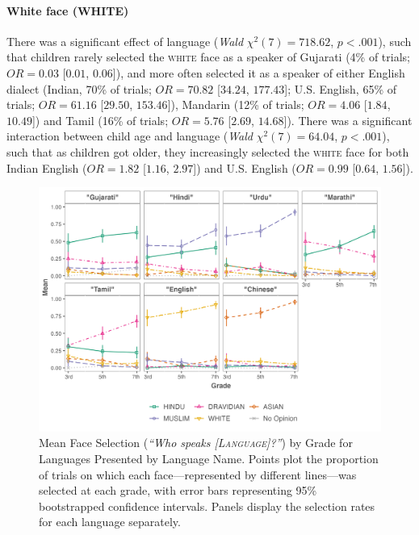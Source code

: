 \documentclass{foushee-adapted-preprint}
\begin{document}
\paragraph*{White face {\small{(WHITE)}}} 
There was a significant effect of language (\textit{Wald} $\chi^2(7)=718.62$, $p<.001$), such that children rarely selected the \textsc{white} face as a speaker of Gujarati (4\% of trials; $OR=0.03$ [$0.01$, $0.06$]), and more often selected it as a speaker of either English dialect (Indian, 70\% of trials; $OR=70.82$ [$34.24$, $177.43$]; U.S. English, 65\% of trials; $OR=61.16$ [$29.50$, $153.46$]), Mandarin (12\% of trials; $OR=4.06$ [$1.84$, $10.49$]) and Tamil (16\% of trials; $OR=5.76$ [$2.69$, $14.68$]). 
There was a significant interaction between child age and language (\textit{Wald} $\chi^2(7)=64.04$, $p<.001$), such that as children got older, they increasingly selected the \textsc{white} face for both Indian English ($OR=1.82$ [$1.16$, $2.97$]) and U.S. English ($OR=0.99$ [$0.64$, $1.56$]).
\begin{figure}
    \centering
    \includegraphics[width=1.2\linewidth]{figures/std_plots/label_faces_std.png}
    \caption{Mean Face Selection (\emph{``Who speaks [\textsc{Language}]?''}) by Grade for Languages Presented by Language Name. Points plot the proportion of trials on which each face---represented by different lines---was selected at each grade, with error bars representing 95\% bootstrapped confidence intervals. Panels display the selection rates for each language separately.}
    \label{fig:faces-language-name}
\vspace{-7pt}
\end{figure}
\end{document}
